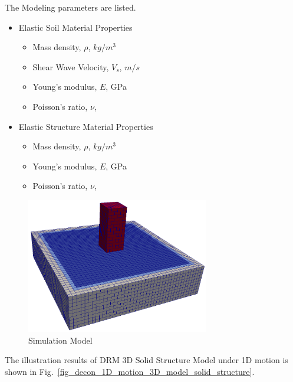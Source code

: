The Modeling parameters are listed.
\begin{itemize}
  \item Elastic Soil Material Properties 
  \begin{itemize}
    \item Mass density, $\rho$, \enspace {} $kg/m^3$
    \item Shear Wave Velocity, $V_s$, \enspace {} $m/s$
    \item Young's modulus, $E$, \enspace {} GPa
    \item Poisson's ratio, $\nu$, \enspace {}
  \end{itemize}
  \item Elastic Structure Material Properties 
  \begin{itemize}
    \item Mass density, $\rho$, \enspace {} $kg/m^3$
    \item Young's modulus, $E$, \enspace {} GPa
    \item Poisson's ratio, $\nu$, \enspace {}
  \end{itemize}
\end{itemize}

\begin{figure}[H]
  \centering
  \includegraphics[width = 8cm]{./Figure-files/Day2/Deconvolution_1D_Motions/Earthquake_Soil-Structure_Interaction_3D_Model_with_DRM/overview.png}
  \caption{Simulation Model}
  \label{fig_decon_1D_motion_3D_model2}
\end{figure}


The illustration results of DRM 3D Solid Structure Model  under 1D motion is shown 
in Fig.~\ref{fig_decon_1D_motion_3D_model_solid_structure}. 

